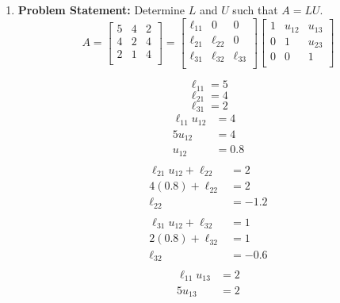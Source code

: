 \documentclass[12pt,twoside]{amsart}
\begin{document}
\begin{enumerate}
    \item \textbf{Problem Statement:} Determine $L$ and $U$ such that $A = LU$.
    $$
    A = \left[\begin{array}{ccc}
        5 & 4 & 2 \\
        4 & 2 & 4 \\
        2 & 1 & 4 \\
    \end{array}\right] = \left[\begin{array}{ccc}
        \ell_{11} & 0 & 0 \\
        \ell_{21} & \ell_{22} & 0 \\
        \ell_{31} & \ell_{32} & \ell_{33} \\
    \end{array}\right]\left[\begin{array}{ccc}
        1 & u_{12} & u_{13} \\
        0 & 1 & u_{23} \\
        0 & 0 & 1 \\
    \end{array}\right]
    $$
    \begin{paracol}{2}
        $$
        \ell_{11} = 5
        $$
        $$
        \ell_{21} = 4
        $$
        $$
        \ell_{31} = 2
        $$
        \begin{align*}
            \ell_{11}u_{12} & = 4 \\
            5u_{12}&  = 4 \\
            u_{12} & = 0.8 \\
        \end{align*}
        \begin{align*}
            \ell_{21}u_{12} + \ell_{22} & = 2 \\
            4(0.8) + \ell_{22} & = 2 \\
            \ell_{22} & = -1.2 \\
        \end{align*}
        \begin{align*}
            \ell_{31}u_{12} + \ell_{32} & = 1 \\
            2(0.8) + \ell_{32} & = 1 \\
            \ell_{32} & = -0.6 \\
        \end{align*}
    \switchcolumn
        \begin{align*}
            \ell_{11}u_{13} & = 2 \\
            5u_{13} & = 2 \\

\end{align*}
\end{paracol}
\end{enumerate}
\end{document}
